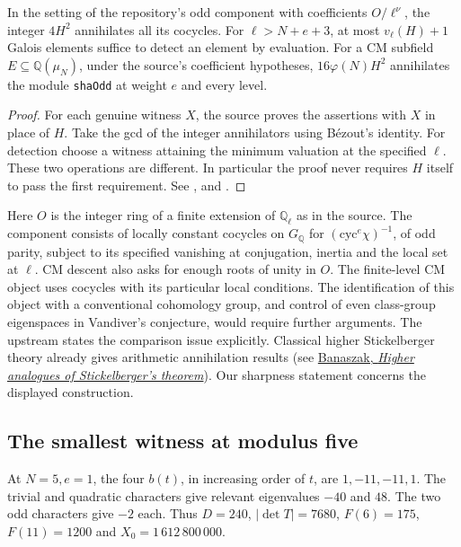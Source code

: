 \begin{corollary}\label{cor:kill}
In the setting of the repository's odd component with coefficients
$O/\ell^\nu$, the integer $4H^2$ annihilates all its cocycles. For
$\ell>N+e+3$, at most $v_\ell(H)+1$ Galois elements suffice to detect an
element by evaluation. For a CM subfield $E\subseteq\mathbb Q(\mu_N)$,
under the source's coefficient hypotheses, $16\varphi(N)H^2$ annihilates
the module \texttt{shaOdd} at weight $e$ and every level.
\end{corollary}
\begin{proof}
For each genuine witness $X$, the source proves the assertions with $X$ in
place of $H$. Take the gcd of the integer annihilators using B\'ezout's
identity. For detection choose a witness attaining the minimum valuation at
the specified $\ell$. These two operations are different. In particular
the proof never requires $H$ itself to pass the first requirement.
See , and
.
\end{proof}
Here $O$ is the integer ring of a finite extension of $\mathbb Q_\ell$ as in
the source. The component consists of locally constant cocycles on
$G_\mathbb Q$ for $(\mathrm{cyc}^e\chi)^{-1}$, of odd parity, subject to its
specified vanishing at conjugation, inertia and the local set at $\ell$.
CM descent also asks for enough roots of unity in $O$. The finite-level
CM object uses cocycles with its particular local conditions.
The identification of this object with a conventional cohomology group,
and control of even class-group eigenspaces in Vandiver's conjecture,
would require further arguments. The upstream
 states the comparison
issue explicitly. Classical higher Stickelberger theory already gives arithmetic annihilation results (see \href{https://archive.numdam.org/articles/10.1016/j.crma.2003.09.019/}{Banaszak, \emph{Higher analogues of Stickelberger's theorem}}). Our sharpness statement concerns the
displayed construction.

\subsection{The smallest witness at modulus five}
At $N=5,e=1$, the four $b(t)$, in increasing order of $t$, are
$1,-11,-11,1$. The trivial and quadratic characters give relevant
eigenvalues $-40$ and $48$. The two odd characters give $-2$ each.
Thus $D=240$, $|\det T|=7680$, $F(6)=175$, $F(11)=1200$ and
$X_0=1\,612\,800\,000$.

